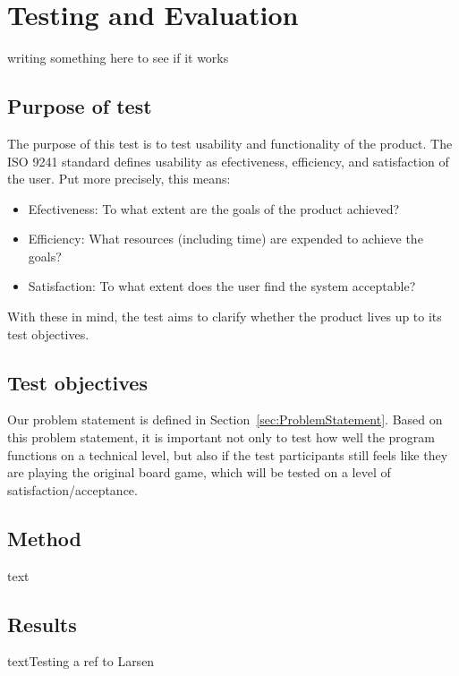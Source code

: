 \chapter{Testing and Evaluation}\label{ch:testeval}
writing something here to see if it works

\section{Purpose of test}
The purpose of this test is to test usability and functionality of the product. The ISO 9241 \citep{ISO} standard defines usability as efectiveness, efficiency, and satisfaction of the user. Put more precisely, this means:
\begin{itemize}
\item Efectiveness: To what extent are the goals of the product achieved?
\item Efficiency: What resources (including time) are expended to achieve the goals?
\item Satisfaction: To what extent does the user find the system acceptable?
\end{itemize}
With these in mind, the test aims to clarify whether the product lives up to its test objectives.

\section{Test objectives}
Our problem statement is defined in Section~\ref{sec:ProblemStatement}. Based on this problem statement, it is important not only to test how well the program functions on a technical level, but also if the test participants still feels like they are playing the original board game, which will be tested on a level of satisfaction/acceptance.

\section{Method}
text

\section{Results}
textTesting a ref to Larsen \citep{TestingLecture}